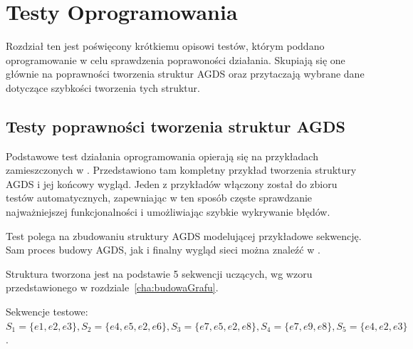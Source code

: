 \chapter{Testy Oprogramowania}
\label{cha:testy}

Rozdział ten jest poświęcony krótkiemu opisowi testów, którym poddano oprogramowanie w celu sprawdzenia poprawoności działania.
Skupiają się one głównie na poprawności tworzenia struktur AGDS oraz przytaczają wybrane dane dotyczące szybkości tworzenia tych struktur.

\section{Testy poprawności tworzenia struktur AGDS}
\label{sec:testAgds}

Podstawowe test działania oprogramowania opierają się na przykładach zamieszczonych w \cite[s. 228 - 232]{Horzyk}. Przedstawiono tam
kompletny przykład tworzenia struktury AGDS i jej końcowy wygląd. Jeden z przykładów włączony został do zbioru testów automatycznych, zapewniając
w ten sposób częste sprawdzanie najważniejszej funkcjonalności i umożliwiając szybkie wykrywanie błędów.

Test polega na zbudowaniu struktury AGDS modelującej przykładowe sekwencję. Sam proces budowy AGDS, jak i finalny wygląd sieci można znaleźć
w \cite[s.232]{Horzyk}. 

Struktura tworzona jest na podstawie 5 sekwencji uczących, wg wzoru przedstawionego w rozdziale~\ref{cha:budowaGrafu}. 

Sekwencje testowe: $S_1 = \{e1, e2, e3\}, S_2=\{e4, e5, e2, e6\}, S_3 = \{e7, e5, e2, e8\}, S_4 = \{e7, e9, e8\}, S_5=\{e4, e2, e3\}$.

